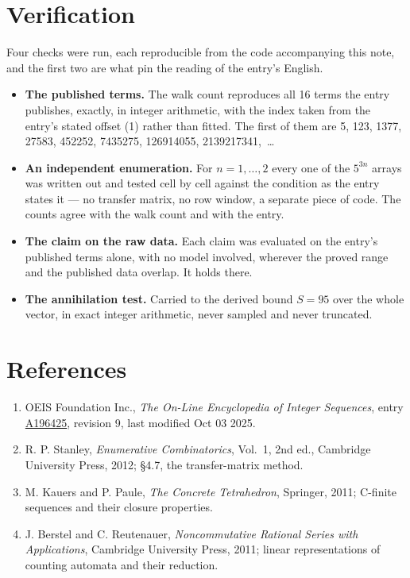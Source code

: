 \documentclass[11pt]{article}
\theoremstyle{definition}
\begin{document}
\section{Verification}

Four checks were run, each reproducible from the code accompanying this note, and the first two are what pin the reading of the entry's English.

\begin{itemize}

\item {\bfseries The published terms.} The walk count reproduces all 16 terms the entry publishes, exactly, in integer arithmetic, with the index taken from the entry's stated offset (1) rather than fitted. The first of them are 5, 123, 1377, 27583, 452252, 7435275, 126914055, 2139217341,~\dots

\item {\bfseries An independent enumeration.} For $n = 1,\dots,2$ every one of the $5^{3n}$ arrays was written out and tested cell by cell against the condition as the entry states it --- no transfer matrix, no row window, a separate piece of code. The counts agree with the walk count and with the entry.

\item {\bfseries The claim on the raw data.} Each claim was evaluated on the entry's published terms alone, with no model involved, wherever the proved range and the published data overlap. It holds there.

\item {\bfseries The annihilation test.} Carried to the derived bound $S = 95$ over the whole vector, in exact integer arithmetic, never sampled and never truncated.

\end{itemize}

\section{References}

\begin{enumerate}

\item OEIS Foundation Inc., \emph{The On-Line Encyclopedia of Integer Sequences}, entry \href{https://oeis.org/A196425}{A196425}, revision 9, last modified Oct 03 2025.

\item R. P. Stanley, \emph{Enumerative Combinatorics}, Vol.~1, 2nd ed., Cambridge University Press, 2012; \S4.7, the transfer-matrix method.

\item M. Kauers and P. Paule, \emph{The Concrete Tetrahedron}, Springer, 2011; C-finite sequences and their closure properties.

\item J. Berstel and C. Reutenauer, \emph{Noncommutative Rational Series with Applications}, Cambridge University Press, 2011; linear representations of counting automata and their reduction.

\end{enumerate}
\end{document}
